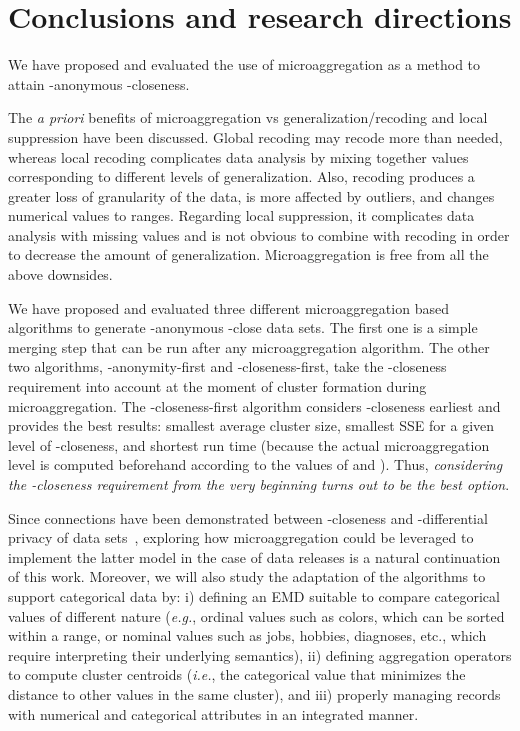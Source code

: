 \documentclass[10pt,journal,compsoc]{IEEEtran}
\theoremstyle{definition}
\theoremstyle{plain}
\begin{document}
\section{Conclusions and research directions}
\label{sec:conclusions}
We have proposed and evaluated the use of microaggregation as a 
method to attain -anonymous -closeness. 

The {\em a priori} benefits of microaggregation vs generalization/recoding and 
local suppression 
have been discussed. Global recoding may recode more than needed,
 whereas local recoding complicates data analysis by mixing
together values corresponding to different levels of generalization.
Also, recoding produces a greater loss of 
granularity of the data, is more
affected by outliers, and changes numerical values to ranges.
Regarding local suppression, it complicates data analysis with 
missing values and is not obvious to combine with recoding
in order to decrease the amount of generalization. 
Microaggregation is free from all the above downsides.  

We have proposed and evaluated three different microaggregation
based algorithms to generate -anonymous -close data sets. 
The first one is a simple merging step that can be run after 
any microaggregation algorithm. The other
two algorithms, -anonymity-first and -closeness-first, take
the -closeness requirement into account at the moment of   
cluster formation during microaggregation. 
The -closeness-first algorithm considers -closeness
earliest and provides
the best results: smallest average cluster size, smallest SSE for a given level 
of -closeness, and shortest run time 
(because the actual microaggregation level is computed
beforehand according to the values of  and ). 
Thus, {\em considering the
-closeness requirement from the very beginning turns out to be 
the best option}. 

Since connections have been demonstrated between 
-closeness and -differential privacy
of data sets~\cite{Soria2013differential,DomingoSoria15}, 
exploring how microaggregation could be leveraged
to implement the latter model in the case of data releases
is a natural continuation of this work. 
Moreover, we will also study the adaptation of the algorithms
to support categorical data by: i) defining an EMD suitable to
compare categorical values of different nature ({\em e.g.}, ordinal values 
such as colors, which can be sorted within a range, 
or nominal values such as jobs, hobbies, diagnoses, etc., 
which require interpreting their underlying semantics), 
ii) defining aggregation operators to compute cluster centroids 
({\em i.e.}, the categorical value that minimizes the distance to 
other values in the same cluster), and iii) properly managing records 
with numerical and categorical attributes in an integrated manner. 
\end{document}
